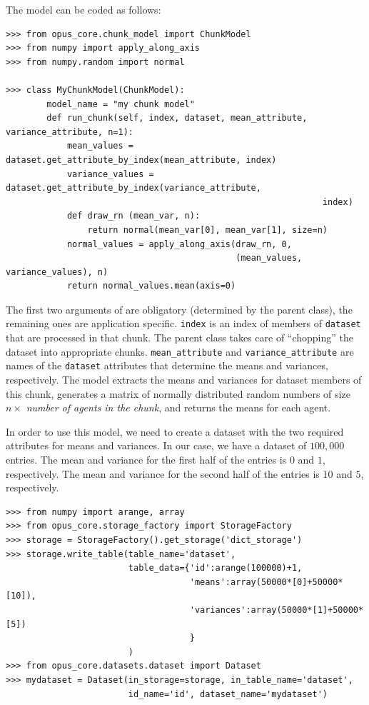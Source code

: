 The model can be coded as follows:

\numpyindex \attributesindex
\begin{verbatim}
>>> from opus_core.chunk_model import ChunkModel
>>> from numpy import apply_along_axis
>>> from numpy.random import normal

>>> class MyChunkModel(ChunkModel):
        model_name = "my chunk model"
        def run_chunk(self, index, dataset, mean_attribute, variance_attribute, n=1):
            mean_values = dataset.get_attribute_by_index(mean_attribute, index)
            variance_values = dataset.get_attribute_by_index(variance_attribute, 
                                                              index)
            def draw_rn (mean_var, n):
                return normal(mean_var[0], mean_var[1], size=n)
            normal_values = apply_along_axis(draw_rn, 0, 
                                             (mean_values, variance_values), n)
            return normal_values.mean(axis=0)
\end{verbatim}
The first two arguments of  are obligatory (determined by the parent class),
the remaining ones are application specific. \verb|index| is an index of members of \verb|dataset|
that are processed in that chunk. The parent class takes care of ``chopping'' the dataset \datasetindex
into appropriate chunks. \verb|mean_attribute| \attributesindex and \verb|variance_attribute| \attributesindex are names of the
\verb|dataset| \datasetindex attributes that determine the means and variances, respectively. The model extracts
the means and variances for dataset members of this chunk, generates a matrix of normally distributed
random numbers of size $n \times$ {\em number of agents in the chunk}, and returns the means for each agent.


In order to use this model, we need to create a dataset \datasetindex with the two required attributes \attributesindex for means and variances.
In our case, we have a dataset \datasetindex of $100,000$ entries. The mean and variance for the first half of the entries
is $0$ and $1$, respectively. The mean and variance for the second half of the entries
is $10$ and $5$, respectively.
\numpyindex{}
\begin{verbatim}
>>> from numpy import arange, array
>>> from opus_core.storage_factory import StorageFactory
>>> storage = StorageFactory().get_storage('dict_storage')
>>> storage.write_table(table_name='dataset',
                        table_data={'id':arange(100000)+1,
                                    'means':array(50000*[0]+50000*[10]),
                                    'variances':array(50000*[1]+50000*[5])
                                    }
                        )
>>> from opus_core.datasets.dataset import Dataset
>>> mydataset = Dataset(in_storage=storage, in_table_name='dataset',
                        id_name='id', dataset_name='mydataset')
\end{verbatim}

